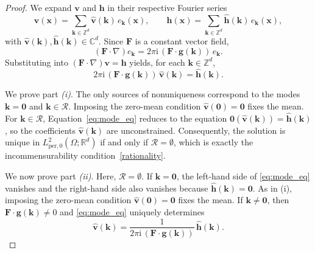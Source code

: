 \documentclass[12pt]{article}
\begin{document}
\begin{proof}

We expand $\boldsymbol{v}$ and $\boldsymbol{h}$ in their respective Fourier series
\[
\boldsymbol v(\boldsymbol  x)=\sum_{\boldsymbol{k}\in\mathbb{Z}^d}\hat{\boldsymbol v}(\boldsymbol{k})\,e_{\boldsymbol{k}}(\boldsymbol  x),
\qquad
\boldsymbol h(\boldsymbol  x)=\sum_{\boldsymbol{k}\in\mathbb{Z}^d}\hat{\boldsymbol h}(\boldsymbol{k})\,e_{\boldsymbol{k}}(\boldsymbol  x),
\]
with $\hat{\boldsymbol v}(\boldsymbol{k}),\hat{\boldsymbol h}(\boldsymbol{k})\in\mathbb{C}^d$. Since $\mathbf F$ is a constant vector field,
\[
(\mathbf F\cdot\nabla)e_{\boldsymbol{k}}=2\pi \mathrm{i}\,(\mathbf F\cdot\boldsymbol{g}(\boldsymbol{k}))\,e_{\boldsymbol{k}}.
\]
Substituting into ${{} (\mathbf F\cdot\nabla)\boldsymbol v=\boldsymbol h}$ yields, for each $\boldsymbol{k}\in\mathbb{Z}^d$,
{{} \begin{equation}\label{eq:mode_eq}
2\pi \mathrm{i}\,(\mathbf F\cdot\boldsymbol{g}(\boldsymbol{k}))\,\hat{\boldsymbol v}(\boldsymbol{k})
=
\hat{\boldsymbol h}(\boldsymbol{k}).
\end{equation}}

We prove part \textit{(i)}.
The only sources of nonuniqueness correspond to the modes $\boldsymbol{k}=\boldsymbol{0}$ and $\boldsymbol{k}\in\mathcal R$. Imposing the zero-mean condition $\hat{\boldsymbol v}(\boldsymbol{0})=\boldsymbol{0}$ fixes the mean. For $\boldsymbol{k}\in\mathcal R$, Equation~\eqref{eq:mode_eq} reduces to the equation $\boldsymbol 0 (\hat{\boldsymbol v}(\boldsymbol{k})) = \hat{\boldsymbol h}(\boldsymbol{k})$, so the coefficients $\hat{\boldsymbol v}(\boldsymbol{k})$ are unconstrained. Consequently, the solution is unique in $L^2_{\mathrm{per},0}(\Omega;\mathbb{R}^d)$ if and only if $\mathcal R=\emptyset$, which is exactly the incommensurability condition~\eqref{rationality}.


We now prove part \textit{(ii)}. Here, $\mathcal R =\emptyset$.  If $\boldsymbol{k}=\boldsymbol 0$, the left-hand side of \eqref{eq:mode_eq} vanishes and the right-hand side also vanishes because
$\hat{\boldsymbol h}(\boldsymbol{k})=\boldsymbol 0$. As in (i), imposing the zero-mean condition $\hat{\boldsymbol v}(\boldsymbol{0})=\boldsymbol{0}$ fixes the mean. If  $\boldsymbol{k}\neq\boldsymbol 0$, then
$\mathbf F\cdot\boldsymbol{g}(\boldsymbol{k})\neq 0$ and \eqref{eq:mode_eq} uniquely determines
\[
{{} \hat{\boldsymbol v}(\boldsymbol{k})
=
\frac{1}{2\pi \mathrm{i}\,(\mathbf F\cdot\boldsymbol{g}(\boldsymbol{k}))}\,\hat{\boldsymbol h}(\boldsymbol{k}).}
\]


\end{proof}
\end{document}

